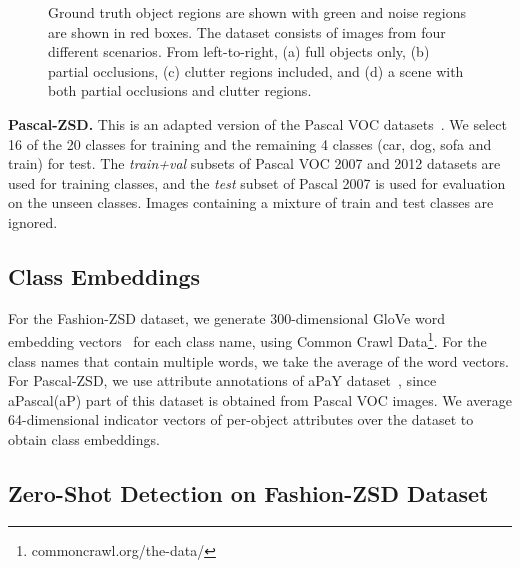 \begin{figure}
\caption{Ground truth object regions are shown with green and noise regions are shown in red boxes. The dataset consists of images from four different scenarios. From left-to-right, (a) full objects only, (b) partial occlusions, (c) clutter regions included, and (d) a scene with both partial occlusions and clutter regions.}
\label{fig:fashion_dataset}
\end{figure}

\vspace{2mm}

\noindent \textbf{Pascal-ZSD.} This is an adapted version of the Pascal VOC datasets~\cite{pascal_voc_IJCV}. We select 16 of the 20 classes for training and the remaining 4 classes (\ie car, dog, sofa and train) for test. The {\em train+val} subsets of Pascal VOC 2007 and 2012 datasets are used for training classes, and the {\em test} subset of Pascal 2007 is used for evaluation on the unseen classes. Images containing a mixture of train and test classes are ignored. 

\subsection{Class Embeddings}
\label{sec:classembed}

For the Fashion-ZSD dataset, we generate 300-dimensional GloVe word embedding vectors~\cite{pennington2014glove} for each class name, using Common Crawl Data\footnote{commoncrawl.org/the-data/}. For the class names that contain multiple words, we take the average of the word vectors. For Pascal-ZSD, we use attribute annotations of aPaY dataset~\cite{farhadi2009describing}, since aPascal(aP) part of this dataset is obtained from Pascal VOC images. We 
average 64-dimensional indicator vectors of per-object attributes over the dataset to obtain class embeddings. 

\subsection{Zero-Shot Detection on Fashion-ZSD Dataset}
\label{sec:fashionexp}

